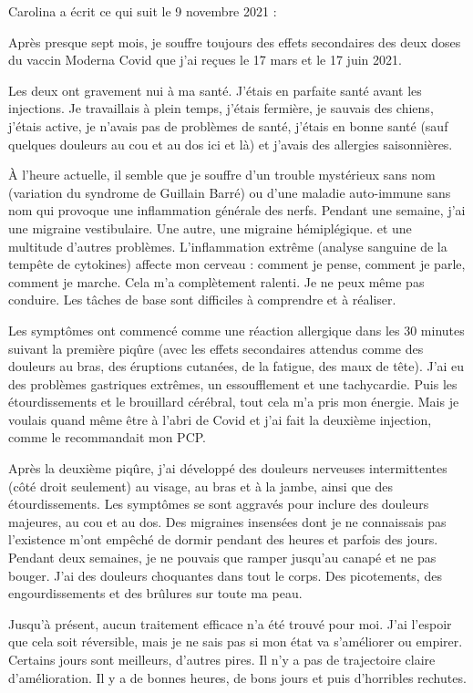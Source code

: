 Carolina a écrit ce qui suit le 9 novembre 2021 :

Après presque sept mois, je souffre toujours des effets secondaires des deux
doses du vaccin Moderna Covid que j'ai reçues le 17 mars et le 17 juin 2021.

Les deux ont gravement nui à ma santé. J'étais en parfaite santé avant les
injections. Je travaillais à plein temps, j'étais fermière, je sauvais des
chiens, j'étais active, je n'avais pas de problèmes de santé, j'étais en bonne
santé (sauf quelques douleurs au cou et au dos ici et là) et j'avais des
allergies saisonnières.

À l'heure actuelle, il semble que je souffre d'un trouble mystérieux sans nom
(variation du syndrome de Guillain Barré) ou d'une maladie auto-immune sans nom
qui provoque une inflammation générale des nerfs. Pendant une semaine, j'ai une
migraine vestibulaire. Une autre, une migraine hémiplégique. et une multitude
d'autres problèmes. L'inflammation extrême (analyse sanguine de la tempête de
cytokines) affecte mon cerveau : comment je pense, comment je parle, comment je
marche. Cela m'a complètement ralenti. Je ne peux même pas conduire. Les tâches
de base sont difficiles à comprendre et à réaliser.

Les symptômes ont commencé comme une réaction allergique dans les 30 minutes
suivant la première piqûre (avec les effets secondaires attendus comme des
douleurs au bras, des éruptions cutanées, de la fatigue, des maux de tête). J'ai
eu des problèmes gastriques extrêmes, un essoufflement et une tachycardie. Puis
les étourdissements et le brouillard cérébral, tout cela m'a pris mon
énergie. Mais je voulais quand même être à l'abri de Covid et j'ai fait la
deuxième injection, comme le recommandait mon PCP.

Après la deuxième piqûre, j'ai développé des douleurs nerveuses intermittentes
(côté droit seulement) au visage, au bras et à la jambe, ainsi que des
étourdissements. Les symptômes se sont aggravés pour inclure des douleurs
majeures, au cou et au dos. Des migraines insensées dont je ne connaissais pas
l'existence m'ont empêché de dormir pendant des heures et parfois des
jours. Pendant deux semaines, je ne pouvais que ramper jusqu'au canapé et ne pas
bouger. J'ai des douleurs choquantes dans tout le corps. Des picotements, des
engourdissements et des brûlures sur toute ma peau.

Jusqu'à présent, aucun traitement efficace n'a été trouvé pour moi. J'ai
l'espoir que cela soit réversible, mais je ne sais pas si mon état va
s'améliorer ou empirer. Certains jours sont meilleurs, d'autres pires. Il n'y a
pas de trajectoire claire d'amélioration. Il y a de bonnes heures, de bons jours
et puis d'horribles rechutes.

